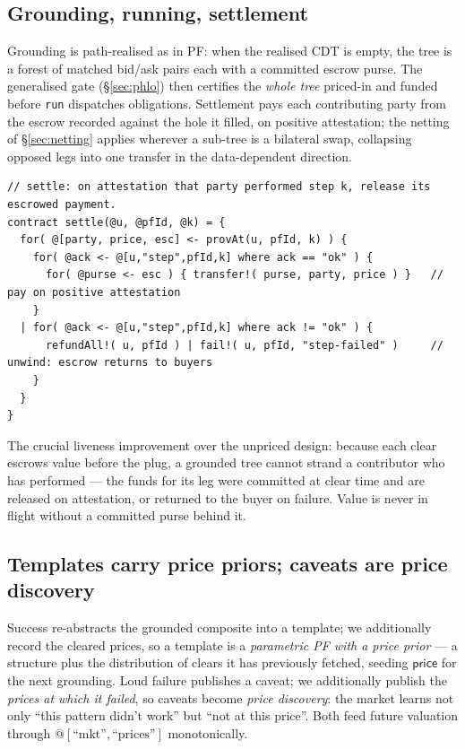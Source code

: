 \documentclass[11pt]{article}
\theoremstyle{definition}
\newcommand{\PF}{\textsf{PF}}
\newcommand{\CDT}{\textsf{CDT}}
\newcommand{\price}{\ensuremath{\mathsf{price}}}
\begin{document}
\subsection{Grounding, running, settlement}
Grounding is path-realised as in \PF{}: when the realised \CDT{} is empty, the tree is a forest of
matched bid/ask pairs each with a committed escrow purse. The generalised gate (\S\ref{sec:phlo})
then certifies the \emph{whole tree} priced-in and funded before \texttt{run} dispatches obligations.
Settlement pays each contributing party from the escrow recorded against the hole it filled, on
positive attestation; the netting of \S\ref{sec:netting} applies wherever a sub-tree is a bilateral
swap, collapsing opposed legs into one transfer in the data-dependent direction.

\begin{lstlisting}
// settle: on attestation that party performed step k, release its escrowed payment.
contract settle(@u, @pfId, @k) = {
  for( @[party, price, esc] <- provAt(u, pfId, k) ) {
    for( @ack <- @[u,"step",pfId,k] where ack == "ok" ) {
      for( @purse <- esc ) { transfer!( purse, party, price ) }   // pay on positive attestation
    }
  | for( @ack <- @[u,"step",pfId,k] where ack != "ok" ) {
      refundAll!( u, pfId ) | fail!( u, pfId, "step-failed" )     // unwind: escrow returns to buyers
    }
  }
}
\end{lstlisting}

\noindent The crucial liveness improvement over the unpriced design: because each clear escrows value
before the plug, a grounded tree cannot strand a contributor who has performed --- the funds for its
leg were committed at clear time and are released on attestation, or returned to the buyer on failure.
Value is never in flight without a committed purse behind it.

\subsection{Templates carry price priors; caveats are price discovery}
Success re-abstracts the grounded composite into a template; we additionally record the cleared
prices, so a template is a \emph{parametric \PF{} with a price prior} --- a structure plus the
distribution of clears it has previously fetched, seeding $\price$ for the next grounding. Loud
failure publishes a caveat; we additionally publish the \emph{prices at which it failed}, so caveats
become \emph{price discovery}: the market learns not only ``this pattern didn't work'' but ``not at
this price''. Both feed future valuation through $@[\text{``mkt''},\text{``prices''}]$ monotonically.
\end{document}
